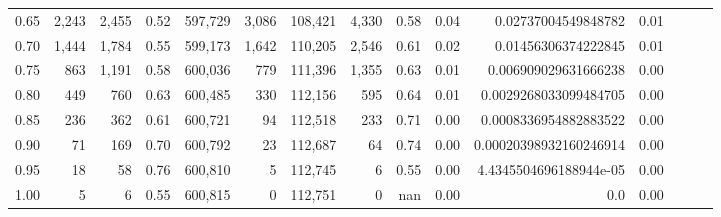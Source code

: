 \begin{tabular}{rrrrrrrrrrrrrrr}
0.65 &    2,243 &   2,455 &  0.52 &  597,729 &    3,086 &  108,421 &    4,330 &  0.58 &  0.04 &     0.02737004549848782 &      0.01 \\
0.70 &    1,444 &   1,784 &  0.55 &  599,173 &    1,642 &  110,205 &    2,546 &  0.61 &  0.02 &     0.01456306374222845 &      0.01 \\
0.75 &      863 &   1,191 &  0.58 &  600,036 &      779 &  111,396 &    1,355 &  0.63 &  0.01 &    0.006909029631666238 &      0.00 \\
0.80 &      449 &     760 &  0.63 &  600,485 &      330 &  112,156 &      595 &  0.64 &  0.01 &   0.0029268033099484705 &      0.00 \\
0.85 &      236 &     362 &  0.61 &  600,721 &       94 &  112,518 &      233 &  0.71 &  0.00 &   0.0008336954882883522 &      0.00 \\
0.90 &       71 &     169 &  0.70 &  600,792 &       23 &  112,687 &       64 &  0.74 &  0.00 &  0.00020398932160246914 &      0.00 \\
0.95 &       18 &      58 &  0.76 &  600,810 &        5 &  112,745 &        6 &  0.55 &  0.00 &  4.4345504696188944e-05 &      0.00 \\
1.00 &        5 &       6 &  0.55 &  600,815 &        0 &  112,751 &        0 &   nan &  0.00 &                     0.0 &      0.00 \\
\bottomrule
\end{tabular}
